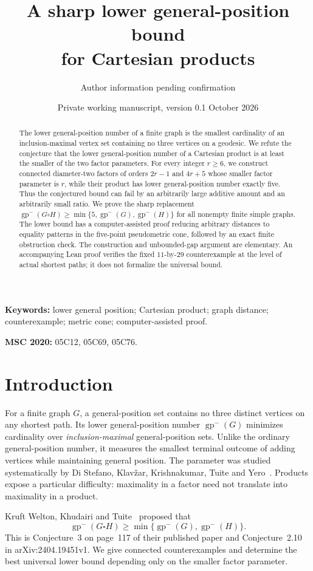 \documentclass[11pt]{article}
\title{A sharp lower general-position bound\protect\\for Cartesian products}
\author{Author information pending confirmation}
\date{Private working manuscript, version 0.1\quad 12 October 2026}
\theoremstyle{definition}
\theoremstyle{remark}
\newcommand{\lgp}{\operatorname{gp}^{-}}
\begin{document}
\maketitle
\begin{abstract}
The lower general-position number of a finite graph is the smallest cardinality
of an inclusion-maximal vertex set containing no three vertices on a geodesic.
We refute the conjecture that the lower general-position number of a Cartesian
product is at least the smaller of the two factor parameters. For every integer
$r\geq 6$, we construct connected diameter-two factors of orders $2r-1$ and
$4r+5$ whose smaller factor parameter is $r$, while their product has lower
general-position number exactly five. Thus the conjectured bound can fail by
an arbitrarily large additive amount and an arbitrarily small ratio. We prove
the sharp replacement
$\lgp(G\square H)\geq\min\{5,\lgp(G),\lgp(H)\}$ for all nonempty finite
simple graphs. The lower bound has a computer-assisted proof reducing arbitrary
distances to equality patterns in the five-point pseudometric cone, followed
by an exact finite obstruction check. The construction and unbounded-gap
argument are elementary. An accompanying Lean proof verifies the fixed
$11$-by-$29$ counterexample at the level of actual shortest paths; it does
not formalize the universal bound.
\end{abstract}

\noindent\textbf{Keywords:} lower general position; Cartesian product;
graph distance; counterexample; metric cone; computer-assisted proof.

\noindent\textbf{MSC 2020:} 05C12, 05C69, 05C76.

\section{Introduction}

For a finite graph $G$, a general-position set contains no three distinct
vertices on any shortest path. Its lower general-position number $\lgp(G)$
minimizes cardinality over \emph{inclusion-maximal} general-position sets.
Unlike the ordinary general-position number, it measures the smallest terminal
outcome of adding vertices while maintaining general position. The parameter
was studied systematically by Di Stefano, Klav\v{z}ar, Krishnakumar, Tuite and
Yero~\cite{lowerGP}. Products expose a particular difficulty: maximality in a
factor need not translate into maximality in a product.

Kruft Welton, Khudairi and Tuite~\cite{WKT} proposed that
\begin{equation}\label{eq:original}
 \lgp(G\square H)\geq\min\{\lgp(G),\lgp(H)\}.
\end{equation}
This is Conjecture~3 on page~117 of their published paper and
Conjecture~2.10 in arXiv:2404.19451v1. We give connected counterexamples and
determine the best universal lower bound depending only on the smaller factor
parameter.
\end{document}

